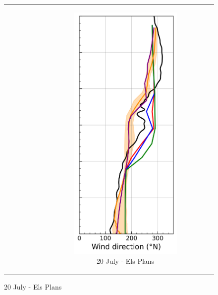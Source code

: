\begin{figure}[hbtp]
{\begin{tabular}{@{}cccc@{}}
\begin{subfigure}[t]{0.283\textwidth}
        \end{subfigure} &
        \begin{subfigure}[t]{0.283\textwidth}
            \caption{20 July - Els Plans}
            \includegraphics[width=\textwidth]{images/chap6/profiles/profile_elsplans_wind_direction_2007_.png}

\end{subfigure}
\end{tabular}}
\end{figure}
